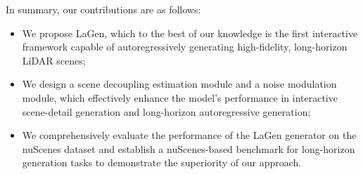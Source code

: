 In summary, our contributions are as follows:
\begin{itemize}[leftmargin=*]
\item We propose LaGen, which to the best of our knowledge is the first interactive framework capable of autoregressively generating high-fidelity, long-horizon LiDAR scenes;
\item We design a scene decoupling estimation module and a noise modulation module, which effectively enhance the model's performance in interactive scene-detail generation and long-horizon autoregressive generation;
\item We comprehensively evaluate the performance of the LaGen generator on the nuScenes dataset and establish a nuScenes-based benchmark for long-horizon generation tasks to demonstrate the superiority of our approach.
\end{itemize}